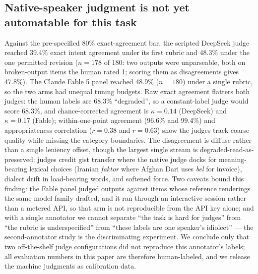 \documentclass[11pt]{article}
\begin{document}
\subsection{Native-speaker judgment is not yet automatable for this task}
\label{sec:judge}
Against the pre-specified 80\% exact-agreement bar, the scripted DeepSeek judge reached 39.4\% exact intent agreement under its first rubric and 48.3\% under the one permitted revision ($n=178$ of 180: two outputs were unparseable, both on broken-output items the human rated 1; scoring them as disagreements gives 47.8\%). The Claude Fable 5 panel reached 48.9\% ($n=180$) under a single rubric, so the two arms had unequal tuning budgets. Raw exact agreement flatters both judges: the human labels are 68.3\% ``degraded'', so a constant-label judge would score 68.3\%, and chance-corrected agreement is $\kappa=0.14$ (DeepSeek) and $\kappa=0.17$ (Fable); within-one-point agreement (96.6\% and 99.4\%) and appropriateness correlation ($r=0.38$ and $r=0.63$) show the judges track coarse quality while missing the category boundaries. The disagreement is diffuse rather than a single leniency offset, though the largest single stream is degraded-read-as-preserved: judges credit gist transfer where the native judge docks for meaning-bearing lexical choices (Iranian \textit{faktor} where Afghan Dari uses \textit{bel} for invoice), dialect drift in load-bearing words, and softened force. Two caveats bound this finding: the Fable panel judged outputs against items whose reference renderings the same model family drafted, and it ran through an interactive session rather than a metered API, so that arm is not reproducible from the API key alone; and with a single annotator we cannot separate ``the task is hard for judges'' from ``the rubric is underspecified'' from ``these labels are one speaker's idiolect'' --- the second-annotator study is the discriminating experiment. We conclude only that two off-the-shelf judge configurations did not reproduce this annotator's labels; all evaluation numbers in this paper are therefore human-labeled, and we release the machine judgments as calibration data.
\end{document}
